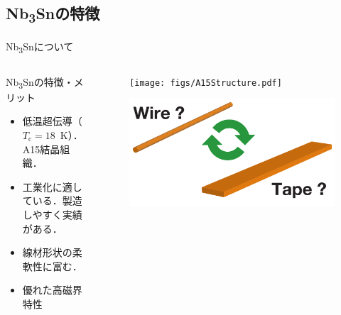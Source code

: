\documentclass[aspectratio=169, unicode, 10pt]{beamer}
\begin{document}
	\subsection{Nb\textsubscript{3}Snの特徴}
	\begin{frame}{Nb\textsubscript{3}Snについて}
		\begin{columns}
			\begin{column}{0.5\linewidth}
				\begin{block}{Nb\textsubscript{3}Snの特徴・メリット}
					\begin{itemize}
						\item 低温超伝導（$T_\mathrm{c} = 18$~K）．A15結晶組織．
						\item 工業化に適している．製造しやすく実績がある．
						\item 線材形状の柔軟性に富む．
						\item 優れた高磁界特性
					\end{itemize}
				\end{block}
				\vspace{5mm}
			\end{column}
			\begin{column}{0.5\linewidth}
				\begin{figure}
					\centering
					\texttt{[image: figs/A15Structure.pdf]}
				\end{figure}
				\begin{figure}
					\centering	
					\includegraphics[width=0.85\linewidth]{figs/wireortape.pdf}
				\end{figure}
			\end{column}
		\end{columns}
	\end{frame}
\end{document}
